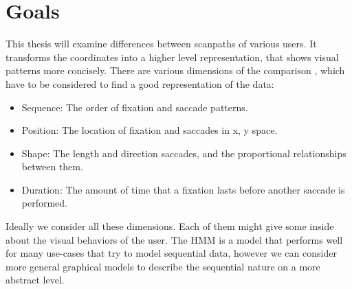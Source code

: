 \documentclass[
        a4paper,     %
        parskip      %
        ]{scrartcl} %
\begin{document}
  
  \section{Goals}
  
This thesis will examine differences between scanpaths of various users. 
It transforms the coordinates into a higher level representation, that shows visual patterns more concisely.
There are various dimensions of the comparison \cite{dewhurst2012depends}, which have to be considered to find a good representation of the data:
\begin{itemize} \itemsep {}
    \item Sequence: The order of fixation and saccade patterns.  %
    \item Position: The location of fixation and saccades in x, y space.  %
    \item Shape: The length and direction saccades, and the proportional relationships between them.
    \item Duration: The amount of time that a fixation lasts before another saccade is performed.
\end{itemize}
 
Ideally we consider all these dimensions. Each of them might give some inside about the visual behaviors of the user.  
The HMM is a model that performs well for many use-cases that try to model sequential data, however we can consider more general graphical models to describe the sequential nature on a more abstract level.   

  


\end{document}
